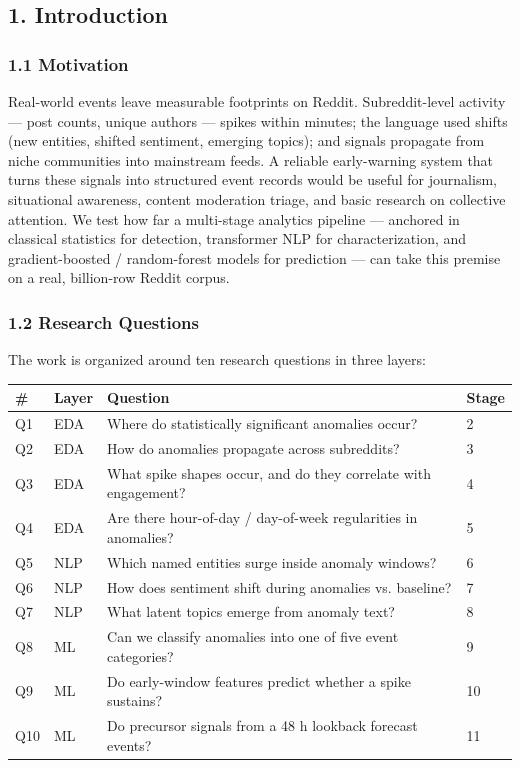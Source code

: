 \documentclass[
]{article}
\newcounter{none} %
\begin{document}
\subsection{1. Introduction}\label{1-introduction}

\subsubsection{1.1 Motivation}\label{11-motivation}

Real-world events leave measurable footprints on Reddit. Subreddit-level
activity --- post counts, unique authors --- spikes within minutes; the
language used shifts (new entities, shifted sentiment, emerging topics);
and signals propagate from niche communities into mainstream feeds. A
reliable early-warning system that turns these signals into structured
event records would be useful for journalism, situational awareness,
content moderation triage, and basic research on collective attention.
We test how far a multi-stage analytics pipeline --- anchored in
classical statistics for detection, transformer NLP for
characterization, and gradient-boosted / random-forest models for
prediction --- can take this premise on a real, billion-row Reddit
corpus.

\subsubsection{1.2 Research Questions}\label{12-research-questions}

The work is organized around ten research questions in three layers:

{\def\LTcaptype{none} %
\begin{longtable}[]{@{}llll@{}}
\toprule\noalign{}
\# & Layer & Question & Stage \\
\midrule\noalign{}
\endhead
\bottomrule\noalign{}
\endlastfoot
Q1 & EDA & Where do statistically significant anomalies occur? & 2 \\
Q2 & EDA & How do anomalies propagate across subreddits? & 3 \\
Q3 & EDA & What spike shapes occur, and do they correlate with
engagement? & 4 \\
Q4 & EDA & Are there hour-of-day / day-of-week regularities in
anomalies? & 5 \\
Q5 & NLP & Which named entities surge inside anomaly windows? & 6 \\
Q6 & NLP & How does sentiment shift during anomalies vs. baseline? &
7 \\
Q7 & NLP & What latent topics emerge from anomaly text? & 8 \\
Q8 & ML & Can we classify anomalies into one of five event categories? &
9 \\
Q9 & ML & Do early-window features predict whether a spike sustains? &
10 \\
Q10 & ML & Do precursor signals from a 48 h lookback forecast events? &
11 \\
\end{longtable}
}
\end{document}
